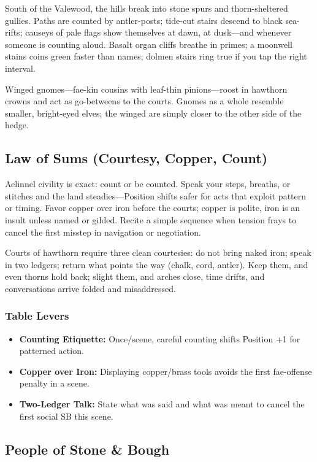 \documentclass[11pt,letterpaper]{article}
\begin{document}
South of the Valewood, the hills break into stone spurs and thorn-sheltered gullies. Paths are counted by antler-posts; tide-cut stairs descend to black sea-rifts; causeys of pale flags show themselves at dawn, at dusk---and whenever someone is counting aloud. Basalt organ cliffs breathe in primes; a moonwell stains coins green faster than names; dolmen stairs ring true if you tap the right interval.

Winged gnomes---fae-kin cousins with leaf-thin pinions---roost in hawthorn crowns and act as go-betweens to the courts. Gnomes as a whole resemble smaller, bright-eyed elves; the winged are simply closer to the other side of the hedge.

\subsection*{Law of Sums (Courtesy, Copper, Count)}

Aelinnel civility is exact: count or be counted. Speak your steps, breaths, or stitches and the land steadies---Position shifts safer for acts that exploit pattern or timing. Favor copper over iron before the courts; copper is polite, iron is an insult unless named or gilded. Recite a simple sequence when tension frays to cancel the first misstep in navigation or negotiation.

Courts of hawthorn require three clean courtesies: do not bring naked iron; speak in two ledgers; return what points the way (chalk, cord, antler). Keep them, and even thorns hold back; slight them, and arches close, time drifts, and conversations arrive folded and misaddressed.

\subsubsection*{Table Levers}
\begin{itemize}
\item \textbf{Counting Etiquette:} Once/scene, careful counting shifts Position +1 for patterned action.
\item \textbf{Copper over Iron:} Displaying copper/brass tools avoids the first fae-offense penalty in a scene.
\item \textbf{Two-Ledger Talk:} State what was said and what was meant to cancel the first social SB this scene.
\end{itemize}

\subsection*{People of Stone \& Bough}
\end{document}
